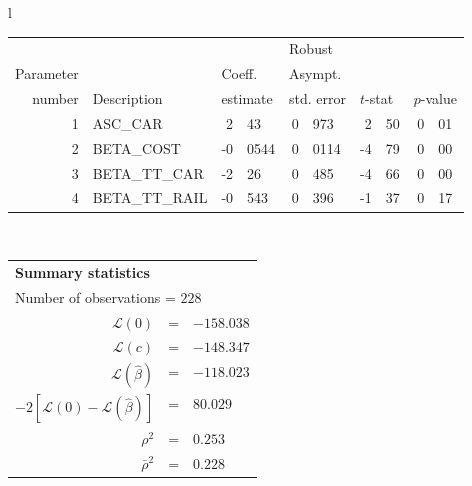   \begin{tabular}{l}
\begin{tabular}{rlr@{.}lr@{.}lr@{.}lr@{.}l}
         &                       &   \multicolumn{2}{l}{}    & \multicolumn{2}{l}{Robust}  &     \multicolumn{4}{l}{}   \\
Parameter &                       &   \multicolumn{2}{l}{Coeff.}      & \multicolumn{2}{l}{Asympt.}  &     \multicolumn{4}{l}{}   \\
number &  Description                     &   \multicolumn{2}{l}{estimate}      & \multicolumn{2}{l}{std. error}  &   \multicolumn{2}{l}{$t$-stat}  &   \multicolumn{2}{l}{$p$-value}   \\

\hline

1 & ASC\_CAR & 2&43 & 0&973 & 2&50 & 0&01 \\
2 & BETA\_COST & -0&0544 & 0&0114 & -4&79 & 0&00 \\
3 & BETA\_TT\_CAR & -2&26 & 0&485 & -4&66 & 0&00 \\
4 & BETA\_TT\_RAIL & -0&543 & 0&396 & -1&37 & 0&17 \\
\hline

\end{tabular}
\\
\begin{tabular}{rcl}
\multicolumn{3}{l}{\bf Summary statistics}\\
\multicolumn{3}{l}{ Number of observations = $228$} \\
 $\mathcal{L}(0)$ &=&  $-158.038$ \\
 $\mathcal{L}(c)$ &=& $-148.347$\\
 $\mathcal{L}(\hat{\beta})$ &=& $-118.023 $  \\
 $-2[\mathcal{L}(0) -\mathcal{L}(\hat{\beta})]$ &=& $80.029$ \\
    $\rho^2$ &=&   $0.253$ \\
    $\bar{\rho}^2$ &=&    $0.228$ \\
\end{tabular}
\end{tabular}

